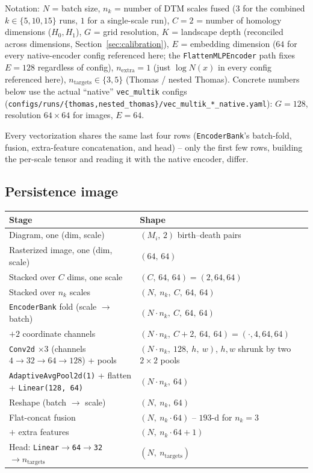 \documentclass[11pt]{article}
\newcommand{\Nb}{N}
\newcommand{\nk}{n_k}
\begin{document}
Notation: $\Nb$ = batch size, $\nk$ = number of DTM scales fused ($3$ for the combined
$k\in\{5,10,15\}$ runs, $1$ for a single-scale run), $C=2$ = number of homology
dimensions ($H_0, H_1$), $G$ = grid resolution, $K$ = landscape depth (reconciled
across dimensions, Section~\ref{sec:calibration}), $E$ = embedding dimension ($64$ for
every native-encoder config referenced here; the \texttt{FlattenMLPEncoder} path fixes
$E=128$ regardless of config), $n_{\mathrm{extra}}=1$ (just $\log N(x)$ in every config
referenced here), $n_{\mathrm{targets}} \in \{3,5\}$ (Thomas / nested Thomas). Concrete
numbers below use the actual ``native'' \texttt{vec\_multik} configs
(\texttt{configs/runs/\{thomas,nested\_thomas\}/vec\_multik\_*\_native.yaml}):
$G=128$, resolution $64\times64$ for images, $E=64$.

Every vectorization shares the same last four rows (\texttt{EncoderBank}'s batch-fold,
fusion, extra-feature concatenation, and head) -- only the first few rows, building
the per-scale tensor and reading it with the native encoder, differ.

\subsection{Persistence image}
\begin{center}
\begin{tabular}{@{}p{6.6cm}p{8.6cm}@{}}
\toprule
Stage & Shape \\
\midrule
Diagram, one (dim, scale) & $(M_i,\,2)$ birth--death pairs \\
Rasterized image, one (dim, scale) & $(64,\,64)$ \\
Stacked over $C$ dims, one scale & $(C,\,64,\,64) = (2,64,64)$ \\
Stacked over $\nk$ scales & $(\Nb,\ \nk,\ C,\ 64,\ 64)$ \\
\texttt{EncoderBank} fold (scale $\to$ batch) & $(\Nb\!\cdot\!\nk,\ C,\ 64,\ 64)$ \\
$+2$ coordinate channels & $(\Nb\!\cdot\!\nk,\ C{+}2,\ 64,\ 64) = (\cdot,4,64,64)$ \\
\texttt{Conv2d} $\times3$ (channels $4\to32\to64\to128$) + pools & $(\Nb\!\cdot\!\nk,\ 128,\ h,\ w)$, $h,w$ shrunk by two $2\!\times\!2$ pools \\
\texttt{AdaptiveAvgPool2d(1)} + flatten + \texttt{Linear(128,\,64)} & $(\Nb\!\cdot\!\nk,\ 64)$ \\
Reshape (batch $\to$ scale) & $(\Nb,\ \nk,\ 64)$ \\
Flat-concat fusion & $(\Nb,\ \nk\!\cdot\!64)$ -- $193$-d for $\nk{=}3$ \\
$+$ extra features & $(\Nb,\ \nk\!\cdot\!64 + 1)$ \\
Head: \texttt{Linear}$\to$\texttt{64}$\to$\texttt{32}$\to n_{\mathrm{targets}}$ & $(\Nb,\ n_{\mathrm{targets}})$ \\
\bottomrule
\end{tabular}
\end{center}
\end{document}
